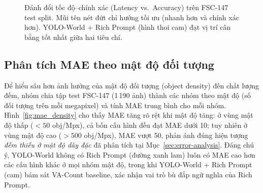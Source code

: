 \documentclass[a4paper,12pt]{report}
\numberwithin{figure}{chapter}
\numberwithin{table}{chapter}
\begin{document}
\begin{figure}[H]
\centering
{}
\caption{Đánh đổi tốc độ--chính xác (Latency vs.\ Accuracy) trên FSC-147 test split. Mũi tên nét đứt chỉ hướng tối ưu (nhanh hơn và chính xác hơn). YOLO-World + Rich Prompt (hình thoi cam) đạt vị trí cân bằng tốt nhất giữa hai tiêu chí.}
\label{fig:latency_accuracy}
\end{figure}

\subsection{Phân tích MAE theo mật độ đối tượng}
\label{subsec:mae-vs-density}

Để hiểu sâu hơn ảnh hưởng của mật độ đối tượng (object density) đến chất lượng đếm, nhóm chia tập test FSC-147 (1\,190 ảnh) thành các nhóm theo mật độ (số đối tượng trên mỗi megapixel) và tính MAE trung bình cho mỗi nhóm. Hình~\ref{fig:mae_density} cho thấy MAE tăng rõ rệt khi mật độ tăng: ở vùng mật độ thấp ($<50$ obj/Mpx), cả bốn cấu hình đều đạt MAE dưới 10; tuy nhiên ở vùng mật độ cao ($>500$ obj/Mpx), MAE vượt 50, phản ánh đúng hiện tượng \emph{đếm thiếu ở mật độ dày đặc} đã phân tích tại Mục~\ref{sec:error-analysis}. Đáng chú ý, YOLO-World không có Rich Prompt (đường xanh lam) luôn có MAE cao hơn các cấu hình khác ở mọi nhóm mật độ, trong khi YOLO-World + Rich Prompt (cam) bám sát VA-Count baseline, xác nhận vai trò bù đắp ngữ nghĩa của Rich Prompt.
\end{document}
